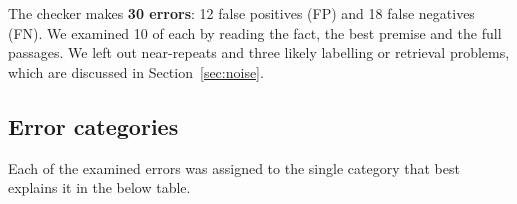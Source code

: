 \documentclass[12pt,a4paper]{article}
\begin{document}
The checker makes \textbf{30 errors}: 12 false positives (FP) and 18 false negatives (FN). We examined 10 of each by reading the fact, the best premise and the full passages. We left out near-repeats and three likely labelling or retrieval problems, which are discussed in Section~\ref{sec:noise}.

\subsection{Error categories}
\label{sec:cats}
Each of the examined errors was assigned to the single category that best explains it in the below table.

\end{document}
